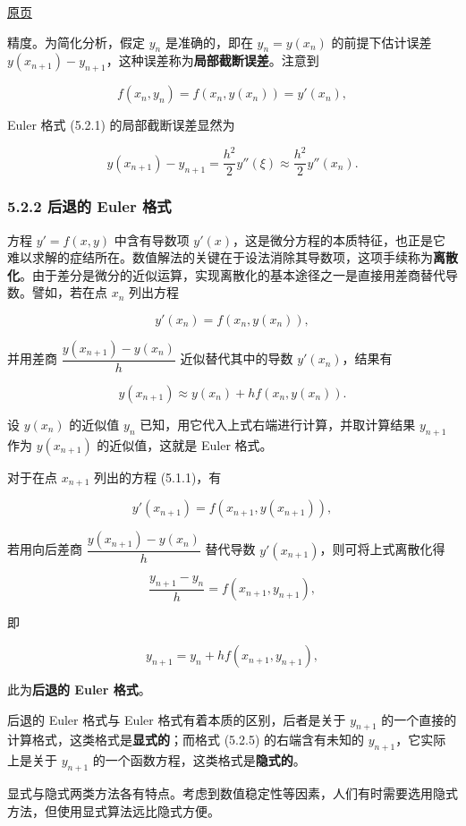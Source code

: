 \documentclass[
  10pt,
  fontset=fandol]{ctexart}
\begin{document}
\href{../../source-images/pdf-121.jpeg}{原页}

精度。为简化分析，假定 \(y_n\) 是准确的，即在 \(y_n=y(x_n)\) 的前提下估计误差 \(y(x_{n+1})-y_{n+1}\)，这种误差称为\textbf{局部截断误差}。注意到

\[
f(x_n,y_n)=f(x_n,y(x_n))=y'(x_n),
\]

Euler 格式 (5.2.1) 的局部截断误差显然为

\[
y(x_{n+1})-y_{n+1}=\frac{h^2}{2}y''(\xi)\approx\frac{h^2}{2}y''(x_n).\tag{5.2.3}
\]

\subsubsection{5.2.2 后退的 Euler 格式}\label{ux540eux9000ux7684-euler-ux683cux5f0f}

方程 \(y'=f(x,y)\) 中含有导数项 \(y'(x)\)，这是微分方程的本质特征，也正是它难以求解的症结所在。数值解法的关键在于设法消除其导数项，这项手续称为\textbf{离散化}。由于差分是微分的近似运算，实现离散化的基本途径之一是直接用差商替代导数。譬如，若在点 \(x_n\) 列出方程

\[
y'(x_n)=f(x_n,y(x_n)),\tag{5.2.4}
\]

并用差商 \(\dfrac{y(x_{n+1})-y(x_n)}{h}\) 近似替代其中的导数 \(y'(x_n)\)，结果有

\[
y(x_{n+1})\approx y(x_n)+hf(x_n,y(x_n)).
\]

设 \(y(x_n)\) 的近似值 \(y_n\) 已知，用它代入上式右端进行计算，并取计算结果 \(y_{n+1}\) 作为 \(y(x_{n+1})\) 的近似值，这就是 Euler 格式。

对于在点 \(x_{n+1}\) 列出的方程 (5.1.1)，有

\[
y'(x_{n+1})=f(x_{n+1},y(x_{n+1})),
\]

若用向后差商 \(\dfrac{y(x_{n+1})-y(x_n)}{h}\) 替代导数 \(y'(x_{n+1})\)，则可将上式离散化得

\[
\frac{y_{n+1}-y_n}{h}=f(x_{n+1},y_{n+1}),
\]

即

\[
y_{n+1}=y_n+hf(x_{n+1},y_{n+1}),\tag{5.2.5}
\]

此为\textbf{后退的 Euler 格式}。

后退的 Euler 格式与 Euler 格式有着本质的区别，后者是关于 \(y_{n+1}\) 的一个直接的计算格式，这类格式是\textbf{显式的}；而格式 (5.2.5) 的右端含有未知的 \(y_{n+1}\)，它实际上是关于 \(y_{n+1}\) 的一个函数方程，这类格式是\textbf{隐式的}。

显式与隐式两类方法各有特点。考虑到数值稳定性等因素，人们有时需要选用隐式方法，但使用显式算法远比隐式方便。
\end{document}
